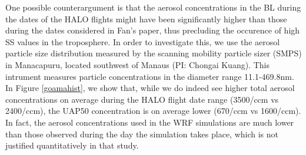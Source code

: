 \documentclass{article}
\begin{document}
One possible counterargument is that the aerosol concentrations in the BL during the dates of the HALO flights might have been significantly higher than those during the dates considered in Fan's paper, thus precluding the occurence of high SS values in the troposphere. In order to investigate this, we use the aerosol particle size distribution measured by the scanning mobility particle sizer (SMPS) in Manacapuru, located southwest of Manaus (PI: Chongai Kuang). This intrument measures particle concentrations in the diameter range 11.1-469.8nm. In Figure \ref{goamahist}, we show that, while we do indeed see higher total aerosol concentrations on average during the HALO flight date range (3500/ccm vs 2400/ccm), the UAP50 concentration is on average lower (670/ccm vs 1600/ccm). In fact, the aerosol concentrations used in the WRF simulations are much lower than those observed during the day the simulation takes place, which is not justified quantitatively in that study.
\end{document}
